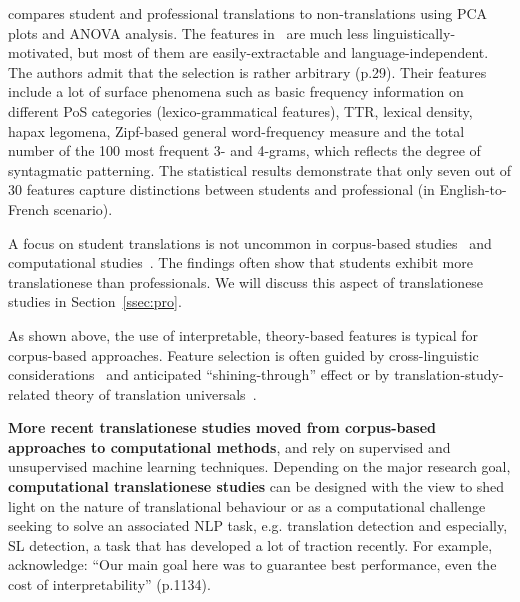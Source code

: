 \citet{Sutter2017} compares student and professional translations to non-translations using \gls{PCA} plots and \gls{ANOVA} analysis. The features in~\citet{Sutter2017} are much less linguistically-motivated, but most of them are easily-extractable and language-independent. The authors admit that the selection is rather arbitrary (p.29). \hypertarget{wd:sutters}{Their features} include a lot of surface phenomena such as basic frequency information on different PoS categories (lexico-grammatical features), TTR, lexical density, hapax legomena, Zipf-based general word-frequency measure and the total number of the 100 most frequent 3- and 4-grams, which reflects the degree of syntagmatic patterning. The statistical results demonstrate that only seven out of 30 features capture distinctions between students and professional (in English-to-French scenario).

A focus on student translations is not uncommon in corpus-based studies~\cite{Nakamura2007,Rabadan2009, Castagnoli2009,Sutter2017,Kunilovskaya2018profiles} and computational studies~\cite{Ilisei2010,Lapshinova2019,Bizzoni2021}. The findings often show that students exhibit more translationese than professionals. We will discuss this aspect of translationese studies in Section~\ref{ssec:pro}.

As shown above, the use of interpretable, theory-based features is typical for corpus-based approaches. Feature selection is often guided by cross-linguistic considerations~\cite[as in][]{Santos1995,Evert2017,Cappelle2017} and anticipated ``shining-through'' effect or by translation-study-related theory of translation universals~\cite{Redelinghuys2015,Redelinghuys2016,Delaere2015}. 

\textbf{More recent translationese studies moved from corpus-based approaches to computational methods}, and rely on supervised and unsupervised machine learning techniques. 
Depending on the major research goal, \textbf{computational translationese studies} can be designed with the view to shed light on the nature of translational behaviour or as a computational challenge seeking to solve an associated NLP task, e.g. translation detection and especially, SL detection, a task that has developed a lot of traction recently. For example, \citet{Sominsky2019} acknowledge: ``Our main goal here was to guarantee best performance, even the cost of interpretability'' (p.1134).

